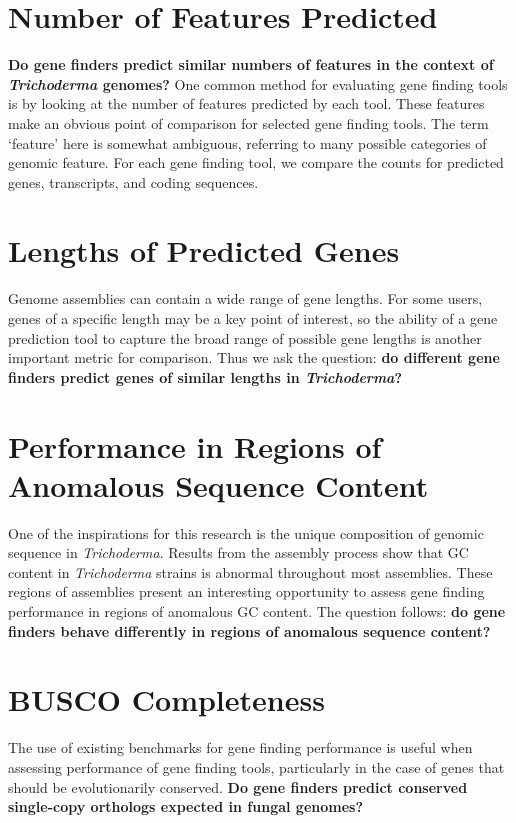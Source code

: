 \section{Number of Features Predicted}

\textbf{Do gene finders predict similar numbers of features in the
  context of \textit{Trichoderma} genomes?} 
\label{rq:number-of-features}  
One common method for
evaluating gene finding tools is by looking at the number of features
predicted by each tool. These features make an obvious point of
comparison for selected gene finding tools. The term `feature' here is
somewhat ambiguous, referring to many possible categories of genomic
feature. For each gene finding tool, we compare the counts for
predicted genes, transcripts, and coding sequences.

\section{Lengths of Predicted Genes}
\label{rq:gene-lengths}

Genome assemblies can contain a wide range of gene lengths. For some
users, genes of a specific length may be a key point of interest, so
the ability of a gene prediction tool to capture the broad range of
possible gene lengths is another important metric for comparison. Thus
we ask the question: \textbf{do different gene finders predict genes
  of similar lengths in \textit{Trichoderma}?}

\section{Performance in Regions of Anomalous Sequence Content}
\label{rq:anomalous-sequence-content}

One of the inspirations for this research is the unique composition of
genomic sequence in \textit{Trichoderma}. Results from the assembly
process show that GC content in \textit{Trichoderma} strains is
abnormal throughout most assemblies. These regions of assemblies
present an interesting opportunity to assess gene finding performance
in regions of anomalous GC content. The question follows: \textbf{do
  gene finders behave differently in regions of anomalous sequence
  content?}

\section{BUSCO Completeness}

The use of existing benchmarks for gene finding performance is useful
when assessing performance of gene finding tools, particularly in the
case of genes that should be evolutionarily conserved. \textbf{Do gene
  finders predict conserved single-copy orthologs expected in fungal
  genomes?}

